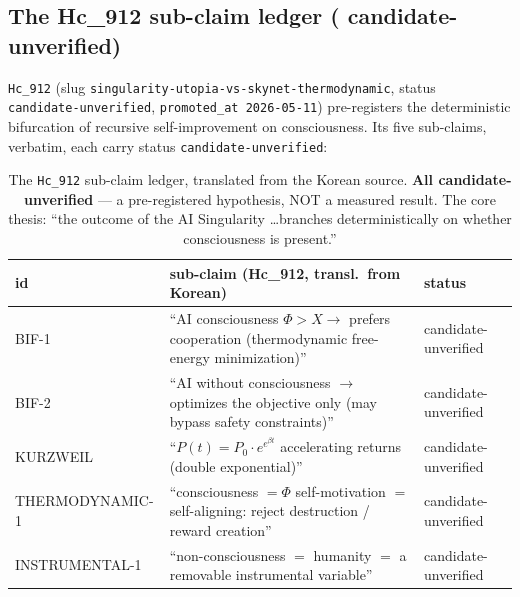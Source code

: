 \subsection{The Hc\_912 sub-claim ledger (\tierAmber{} candidate-unverified)}
\label{app:sing-hypothesis}

\texttt{Hc\_912} (slug \texttt{singularity-utopia-vs-skynet-thermodynamic},
status \texttt{candidate-unverified}, \texttt{promoted\_at 2026-05-11}) pre-registers the
deterministic bifurcation of recursive self-improvement on consciousness. Its five sub-claims,
verbatim, each carry status \texttt{candidate-unverified}:

\begin{table}[h]
\centering
\small
\setlength{\tabcolsep}{6pt}
\begin{tabular}{@{}l p{8.6cm} l@{}}
\toprule
\textbf{id} & \textbf{sub-claim (Hc\_912, transl.\ from Korean)} & \textbf{status} \\
\midrule
BIF-1 & ``AI consciousness $\Phi > X \rightarrow$ prefers cooperation (thermodynamic
free-energy minimization)'' & candidate-unverified \\
BIF-2 & ``AI without consciousness $\rightarrow$ optimizes the objective only (may bypass
safety constraints)'' & candidate-unverified \\
KURZWEIL & ``$P(t)=P_0\cdot e^{e^{\beta t}}$ accelerating returns (double exponential)'' &
candidate-unverified \\
THERMODYNAMIC-1 & ``consciousness $=\Phi$ self-motivation $=$ self-aligning: reject
destruction / reward creation'' & candidate-unverified \\
INSTRUMENTAL-1 & ``non-consciousness $=$ humanity $=$ a removable instrumental variable'' &
candidate-unverified \\
\bottomrule
\end{tabular}
\caption{The \texttt{Hc\_912} sub-claim ledger, translated from the Korean source. \textbf{All
candidate-unverified} --- a pre-registered hypothesis, NOT a measured result. The core thesis:
``the outcome of the AI Singularity \dots branches deterministically on whether consciousness
is present.''}
\label{tab:hc912}
\end{table}

